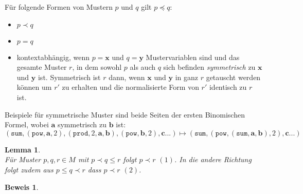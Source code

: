 Für folgende Formen von Mustern $p$ und $q$ gilt $p \preceq q$:
\begin{itemize}
    \item{$p \prec q$}
    
    \item{$p = q$}
    
    \item{kontextabhängig, wenn $p = \mathbf x$ und $q = \mathbf y$ Mustervariablen sind und das gesamte Muster $r$, in dem sowohl $p$ als auch $q$ sich befinden \emph{symmetrisch} zu $\mathbf x$ und $\mathbf y$ ist. Symmetrisch ist $r$ dann, wenn $\mathbf x$ und $\mathbf y$ in ganz $r$ getauscht werden können um $r'$ zu erhalten und die normalisierte Form von $r'$ identisch zu $r$ ist.}
\end{itemize}


Beispiele für symmetrische Muster sind beide Seiten der ersten Binomischen Formel, wobei $\mathbf a$ symmetrisch zu $\mathbf b$ ist:
$$(\texttt{sum}, (\texttt{pow}, \mathbf a, 2), (\texttt{prod}, 2, \mathbf a, \mathbf b), (\texttt{pow}, \mathbf b, 2), \mathbf {c...}) \mapsto (\texttt{sum}, (\texttt{pow}, (\texttt{sum}, \mathbf a, \mathbf b), 2), \mathbf {c...})$$


\newtheorem{lemTransitivStark}[bsp]{Lemma}
\begin{lemTransitivStark}~\\
Für Muster $p, q, r \in M$ mit $p \prec q \leq r$ folgt $p \prec r$ $(1)$. In die andere Richtung folgt zudem aus $p \leq q \prec r$ dass $p \prec r$ $(2)$.
\end{lemTransitivStark}

\newtheorem{bewTransitivStark}[bsp]{Beweis}
\begin{bewTransitivStark}~\\
\end{bewTransitivStark}
























